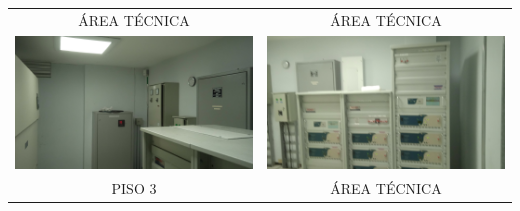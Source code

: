 \documentclass[12pt,a4paper,twoside]{article}
\begin{document}
\begin{tabular}{ c c }
    ÁREA TÉCNICA & ÁREA TÉCNICA\\
	\includegraphics[width = 7 cm]{Imagenes/23} & \includegraphics[width = 7 cm]{Imagenes/24} \\
    PISO 3 & ÁREA TÉCNICA\\

	
\end{tabular} 
\end{document}
